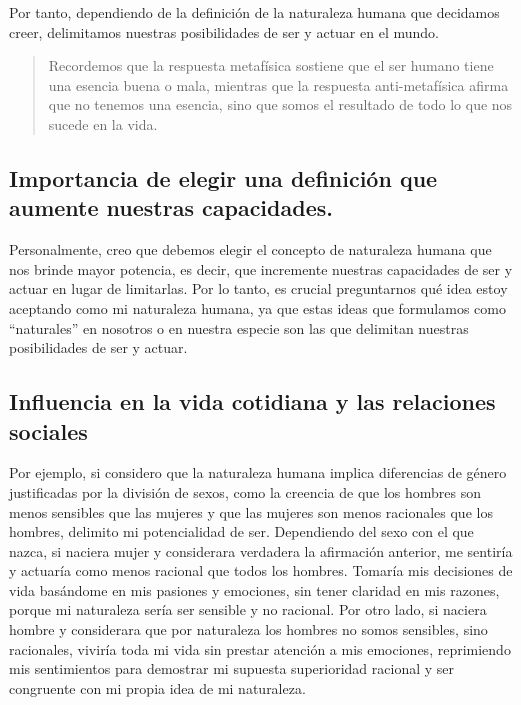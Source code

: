 \documentclass[
  a4paper,
]{article}
\begin{document}
Por tanto, dependiendo de la definición de la naturaleza humana que
decidamos creer, delimitamos nuestras posibilidades de ser y actuar en
el mundo.

\begin{quote}
Recordemos que la respuesta metafísica sostiene que el ser humano tiene
una esencia buena o mala, mientras que la respuesta anti-metafísica
afirma que no tenemos una esencia, sino que somos el resultado de todo
lo que nos sucede en la vida.
\end{quote}

\subsection{Importancia de elegir una definición que aumente nuestras
capacidades.}\label{importancia-de-elegir-una-definiciuxf3n-que-aumente-nuestras-capacidades.}

Personalmente, creo que debemos elegir el concepto de naturaleza humana
que nos brinde mayor potencia, es decir, que incremente nuestras
capacidades de ser y actuar en lugar de limitarlas. Por lo tanto, es
crucial preguntarnos qué idea estoy aceptando como mi naturaleza humana,
ya que estas ideas que formulamos como ``naturales'' en nosotros o en
nuestra especie son las que delimitan nuestras posibilidades de ser y
actuar.

\subsection{Influencia en la vida cotidiana y las relaciones
sociales}\label{influencia-en-la-vida-cotidiana-y-las-relaciones-sociales}

Por ejemplo, si considero que la naturaleza humana implica diferencias
de género justificadas por la división de sexos, como la creencia de que
los hombres son menos sensibles que las mujeres y que las mujeres son
menos racionales que los hombres, delimito mi potencialidad de ser.
Dependiendo del sexo con el que nazca, si naciera mujer y considerara
verdadera la afirmación anterior, me sentiría y actuaría como menos
racional que todos los hombres. Tomaría mis decisiones de vida basándome
en mis pasiones y emociones, sin tener claridad en mis razones, porque
mi naturaleza sería ser sensible y no racional. Por otro lado, si
naciera hombre y considerara que por naturaleza los hombres no somos
sensibles, sino racionales, viviría toda mi vida sin prestar atención a
mis emociones, reprimiendo mis sentimientos para demostrar mi supuesta
superioridad racional y ser congruente con mi propia idea de mi
naturaleza.
\end{document}
